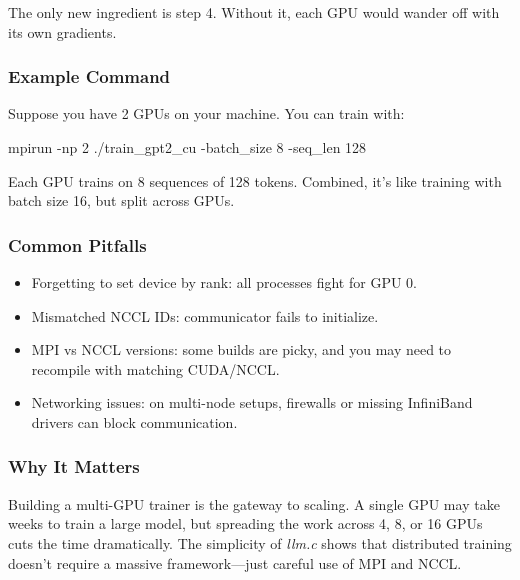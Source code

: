 \documentclass[
  letterpaper,
  DIV=11,
  numbers=noendperiod]{scrreprt}
\newenvironment{Shaded}{\begin{snugshade}}{\end{snugshade}}
\newcommand{\AttributeTok}[1]{\textcolor[rgb]{0.40,0.45,0.13}{#1}}
\newcommand{\ExtensionTok}[1]{\textcolor[rgb]{0.00,0.23,0.31}{#1}}
\newcommand{\NormalTok}[1]{\textcolor[rgb]{0.00,0.23,0.31}{#1}}
\providecommand{\tightlist}{%
  \setlength{\itemsep}{0pt}\setlength{\parskip}{0pt}}
\begin{document}
The only new ingredient is step 4. Without it, each GPU would wander off
with its own gradients.

\subsubsection{Example Command}\label{example-command}

Suppose you have 2 GPUs on your machine. You can train with:

\begin{Shaded}
\begin{Highlighting}[]
\ExtensionTok{mpirun} \AttributeTok{{-}np}\NormalTok{ 2 ./train\_gpt2\_cu }\AttributeTok{{-}batch\_size}\NormalTok{ 8 }\AttributeTok{{-}seq\_len}\NormalTok{ 128}
\end{Highlighting}
\end{Shaded}

Each GPU trains on 8 sequences of 128 tokens. Combined, it's like
training with batch size 16, but split across GPUs.

\subsubsection{Common Pitfalls}\label{common-pitfalls-1}

\begin{itemize}
\tightlist
\item
  Forgetting to set device by rank: all processes fight for GPU 0.
\item
  Mismatched NCCL IDs: communicator fails to initialize.
\item
  MPI vs NCCL versions: some builds are picky, and you may need to
  recompile with matching CUDA/NCCL.
\item
  Networking issues: on multi-node setups, firewalls or missing
  InfiniBand drivers can block communication.
\end{itemize}

\subsubsection{Why It Matters}\label{why-it-matters-48}

Building a multi-GPU trainer is the gateway to scaling. A single GPU may
take weeks to train a large model, but spreading the work across 4, 8,
or 16 GPUs cuts the time dramatically. The simplicity of \emph{llm.c}
shows that distributed training doesn't require a massive
framework---just careful use of MPI and NCCL.
\end{document}
